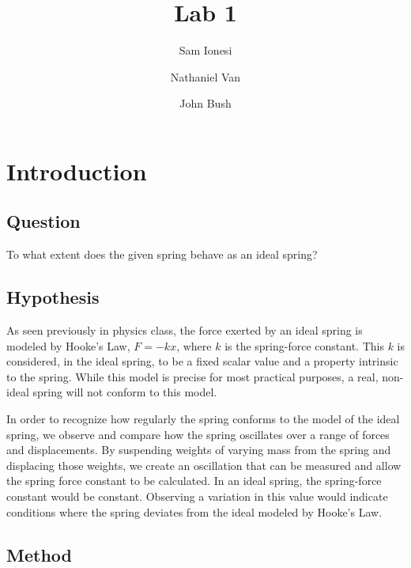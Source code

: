 \documentclass{article}
\author{Sam Ionesi \and Nathaniel Van \and John Bush}
\title{Lab 1}
\numberwithin{figure}{section}
\numberwithin{table}{section}
\begin{document}
 

\maketitle

\section{Introduction} 

\subsection{Question} 

To what extent does the given spring behave as an ideal spring?

\subsection{Hypothesis} 

As seen previously in physics class, the force exerted by an ideal spring is modeled by Hooke's Law, $F = -kx$, where $k$ is the spring-force constant. This $k$ is considered, in the ideal spring, to be a fixed scalar value and a property intrinsic to the spring.  While this model is precise for most practical purposes, a real, non-ideal spring will not conform to this model.

In order to recognize how regularly the spring conforms to the model of the ideal spring, we observe and compare how the spring oscillates over a range of forces and displacements.  By suspending weights of varying mass from the spring and displacing those weights, we create an oscillation that can be measured and allow the spring force constant to be calculated.  In an ideal spring, the spring-force constant would be constant.  Observing a variation in this value would indicate conditions where the spring deviates from the ideal modeled by Hooke's Law.



\subsection{Method} 
\end{document}
